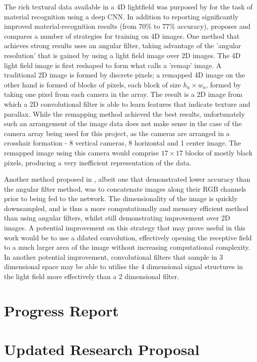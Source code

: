 \documentclass[openany]{book}
\begin{document}
The rich textural data available in a 4D lightfield was purposed by \cite{wang2016lfcnn} for the task of material recognition using a deep CNN. In addition to reporting significantly improved material-recognition results (from 70\% to 77\% accuracy), \cite{wang2016lfcnn} proposes and compares a number of strategies for training on 4D images. One method that achieves strong results uses an angular filter, taking advantage of the 'angular resolution' that is gained by using a light field image over 2D images. The 4D light field image is first reshaped to form what \cite{wang2016lfcnn} calls a 'remap' image. A traditional 2D image is formed by discrete pixels; a remapped 4D image on the other hand is formed of blocks of pixels, each block of size $h_a \times w_a$, formed by taking one pixel from each camera in the array. The result is a 2D image from which a 2D convolutional filter is able to learn features that indicate texture and parallax. While the remapping method achieved the best results, unfortunately such an arrangement of the image data does not make sense in the case of the camera array being used for this project, as the cameras are arranged in a crosshair formation - 8 vertical cameras, 8 horizontal and 1 center image. The remapped image using this camera would comprise $17 \times 17$ blocks of mostly black pixels, producing a very inefficient representation of the data. 

Another method proposed in \cite{wang2016lfcnn}, albeit one that demonstrated lower accuracy than the angular filter method, was to concatenate images along their RGB channels prior to being fed to the network. The dimensionality of the image is quickly downsampled, and is thus a more computationally and memory efficient method than using angular filters, whilst still demonstrating improvement over 2D images. A potential improvement on this strategy that may prove useful in this work would be to use a dilated convolution, effectively opening the receptive field to a much larger area of the image without increasing computational complexity. In another potential improvement, convolutional filters that sample in 3 dimensional space may be able to utilise the 4 dimensional signal structures in the light field more effectively than a 2 dimensional filter.

\chapter{Progress Report}



\chapter{Updated Research Proposal}


\newpage



\end{document}

